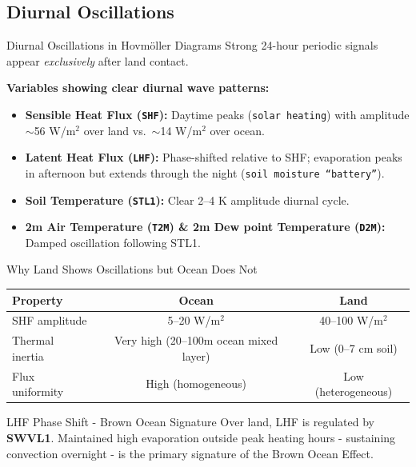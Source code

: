 \documentclass[10pt, aspectratio=169,t,xcolor=table]{beamer}
\begin{document}
\subsection{Diurnal Oscillations}
\begin{frame}{Diurnal Oscillations in Hovm\"oller Diagrams}
	Strong 24-hour periodic signals appear \textit{exclusively} after land contact.

	\vspace{0.2cm}
	\footnotesize
	\textbf{Variables showing clear diurnal wave patterns:}
	\begin{itemize}
		\item \textbf{Sensible Heat Flux (\texttt{SHF}):} Daytime peaks (\texttt{solar heating}) with amplitude $\sim$56 W/m$^2$ over land vs.\ $\sim$14 W/m$^2$ over ocean.
		\item \textbf{Latent Heat Flux (\texttt{LHF}):} Phase-shifted relative to SHF; evaporation peaks in afternoon but extends through the night (\texttt{soil moisture ``battery''}).
		\item \textbf{Soil Temperature (\texttt{STL1}):} Clear 2–4 K amplitude diurnal cycle.
		\item \textbf{2m Air Temperature (\texttt{T2M}) \& 2m Dew point Temperature (\texttt{D2M}):} Damped oscillation following STL1.
	\end{itemize}

	\vspace{0.2cm}
	\begin{block}{\small Why Land Shows Oscillations but Ocean Does Not}
		\footnotesize
		\begin{center}
			\begin{tabular}{lcc}
				\toprule
				\rowcolor{MyBlue!15}
				Property        & Ocean                                 & Land                \\
				\midrule
				SHF amplitude   & 5–20 W/m$^2$                          & 40–100 W/m$^2$      \\
				Thermal inertia & Very high (20–100m ocean mixed layer) & Low (0–7 cm soil)   \\
				Flux uniformity & High (homogeneous)                    & Low (heterogeneous) \\
				\bottomrule
			\end{tabular}
		\end{center}
	\end{block}

	\begin{alertblock}{\small LHF Phase Shift - Brown Ocean Signature}
		\footnotesize
		Over land, LHF is regulated by \textbf{SWVL1}.
		Maintained high evaporation outside peak heating hours -
		sustaining convection overnight - is the primary signature
		of the Brown Ocean Effect.
	\end{alertblock}
\end{frame}
\end{document}
